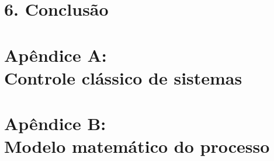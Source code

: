 \documentclass[12pt, a4paper]{report}
\begin{document}
\chapter[Conclusão]{6. Conclusão}












\appendix

\chapter[Apêndice A: Controle clássico de sistemas]{Apêndice A: \\ Controle clássico de sistemas}
\newpage


\chapter[Apêndice B: Modelo matemático do processo]{Apêndice B: \\ Modelo matemático do processo}
\newpage

\end{document}
